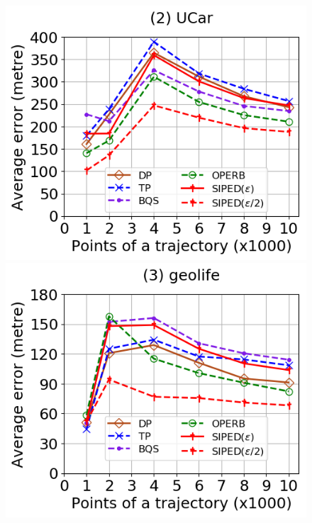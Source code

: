 \begin{figure}[tb!]
	\centering
	\includegraphics[scale=0.320]{Figures/Exp-query-PED-error-size-service.png} 	\hspace{3ex}
	\includegraphics[scale=0.320]{Figures/Exp-query-PED-error-size-geolife.png}	\hspace{3ex}

\end{figure}
